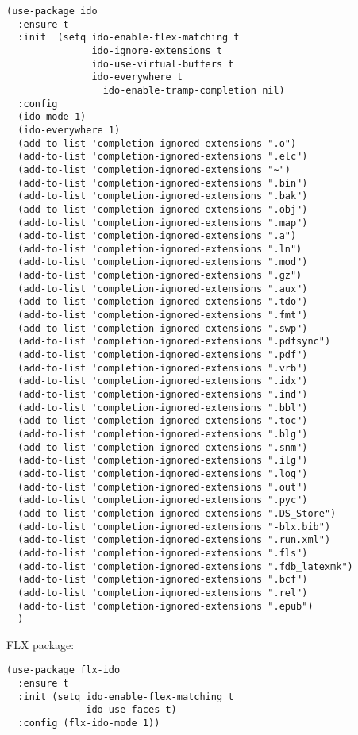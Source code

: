 \documentclass[12pt]{article}
\begin{document}
\lstset{language=Lisp,label= ,caption= ,numbers=none}
\begin{lstlisting}
(use-package ido
  :ensure t
  :init  (setq ido-enable-flex-matching t
               ido-ignore-extensions t
               ido-use-virtual-buffers t
               ido-everywhere t
                 ido-enable-tramp-completion nil)
  :config
  (ido-mode 1)
  (ido-everywhere 1)
  (add-to-list 'completion-ignored-extensions ".o")
  (add-to-list 'completion-ignored-extensions ".elc")
  (add-to-list 'completion-ignored-extensions "~")
  (add-to-list 'completion-ignored-extensions ".bin")
  (add-to-list 'completion-ignored-extensions ".bak")
  (add-to-list 'completion-ignored-extensions ".obj")
  (add-to-list 'completion-ignored-extensions ".map")
  (add-to-list 'completion-ignored-extensions ".a")
  (add-to-list 'completion-ignored-extensions ".ln")
  (add-to-list 'completion-ignored-extensions ".mod")
  (add-to-list 'completion-ignored-extensions ".gz")
  (add-to-list 'completion-ignored-extensions ".aux")
  (add-to-list 'completion-ignored-extensions ".tdo")
  (add-to-list 'completion-ignored-extensions ".fmt")
  (add-to-list 'completion-ignored-extensions ".swp")
  (add-to-list 'completion-ignored-extensions ".pdfsync")
  (add-to-list 'completion-ignored-extensions ".pdf")
  (add-to-list 'completion-ignored-extensions ".vrb")
  (add-to-list 'completion-ignored-extensions ".idx")
  (add-to-list 'completion-ignored-extensions ".ind")
  (add-to-list 'completion-ignored-extensions ".bbl")
  (add-to-list 'completion-ignored-extensions ".toc")
  (add-to-list 'completion-ignored-extensions ".blg")
  (add-to-list 'completion-ignored-extensions ".snm")
  (add-to-list 'completion-ignored-extensions ".ilg")
  (add-to-list 'completion-ignored-extensions ".log")
  (add-to-list 'completion-ignored-extensions ".out")
  (add-to-list 'completion-ignored-extensions ".pyc")
  (add-to-list 'completion-ignored-extensions ".DS_Store")
  (add-to-list 'completion-ignored-extensions "-blx.bib")
  (add-to-list 'completion-ignored-extensions ".run.xml")
  (add-to-list 'completion-ignored-extensions ".fls")
  (add-to-list 'completion-ignored-extensions ".fdb_latexmk")
  (add-to-list 'completion-ignored-extensions ".bcf")
  (add-to-list 'completion-ignored-extensions ".rel")
  (add-to-list 'completion-ignored-extensions ".epub")
  )
\end{lstlisting}

FLX package:

\lstset{language=Lisp,label= ,caption= ,numbers=none}
\begin{lstlisting}
(use-package flx-ido
  :ensure t
  :init (setq ido-enable-flex-matching t
              ido-use-faces t)
  :config (flx-ido-mode 1))
\end{lstlisting}
\end{document}
